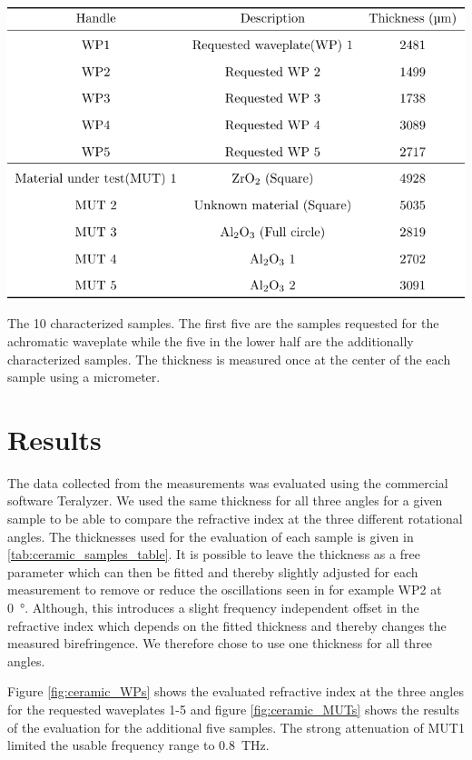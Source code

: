 \begin{table}[h]
    \centering
    \includegraphics[scale=1.0]{images/appendix/ceramic_samples_table.pdf}
    \caption{The 10 characterized samples. The first five are the samples requested for the achromatic waveplate while the five in the lower half are the additionally characterized samples. The thickness is measured once at the center of the each sample using a micrometer.}
    \label{tab:ceramic_samples_table}
\end{table}

\newpage

\section{Results}
The data collected from the measurements was evaluated using the commercial software Teralyzer. We used the same thickness for all three angles for a given sample to be able to compare the refractive index at the three different rotational angles. The thicknesses used for the evaluation of each sample is given in \ref{tab:ceramic_samples_table}. 
It is possible to leave the thickness as a free parameter which can then be fitted and thereby slightly adjusted for each measurement to remove or reduce the oscillations seen in for example WP2 at \SI{0}{\degree}. Although, this introduces a slight frequency independent offset in the refractive index which depends on the fitted thickness and thereby changes the measured birefringence. We therefore chose to use one thickness for all three angles. 

Figure \ref{fig:ceramic_WPs} shows the evaluated refractive index at the three angles for the requested waveplates 1-5 and figure \ref{fig:ceramic_MUTs} shows the results of the evaluation for the additional five samples. The strong attenuation of MUT1 limited the usable frequency range to \SI{0.8}{\tera \hertz}. 

